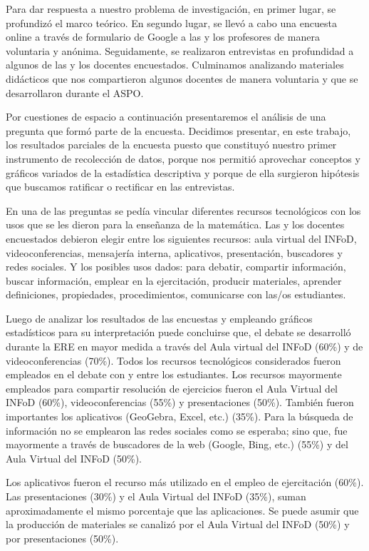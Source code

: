 Para dar respuesta a nuestro problema de investigación, en primer lugar, se profundizó el marco teórico. En segundo lugar, se llevó a cabo una encuesta online a través de formulario de Google a las y los profesores de manera voluntaria y anónima. Seguidamente, se realizaron entrevistas en profundidad a algunos de las y los docentes encuestados. Culminamos analizando materiales didácticos que nos compartieron algunos docentes de manera voluntaria y que se desarrollaron durante el ASPO.

Por cuestiones de espacio a continuación presentaremos el análisis de una pregunta que formó parte de la encuesta. Decidimos presentar, en este trabajo, los resultados parciales de la encuesta puesto que constituyó nuestro primer instrumento de recolección de datos, porque nos permitió aprovechar conceptos y gráficos variados de la estadística descriptiva y porque de ella surgieron hipótesis que buscamos ratificar o rectificar en las entrevistas.

En una de las preguntas se pedía vincular diferentes recursos tecnológicos con los usos que se les dieron para la enseñanza de la matemática. Las y los docentes encuestados debieron elegir entre los siguientes recursos: aula virtual del INFoD, videoconferencias, mensajería interna, aplicativos, presentación, buscadores y redes sociales. Y los posibles usos dados: para debatir, compartir información, buscar información, emplear en la ejercitación, producir materiales, aprender definiciones, propiedades, procedimientos, comunicarse con las/os estudiantes.

Luego de analizar los resultados de las encuestas y empleando gráficos estadísticos para su interpretación puede concluirse que, el debate se desarrolló durante la ERE en mayor medida a través del Aula virtual del INFoD (60\%) y de videoconferencias (70\%). Todos los recursos tecnológicos considerados fueron empleados en el debate con y entre los estudiantes. Los recursos mayormente empleados para compartir resolución de ejercicios fueron el Aula Virtual del INFoD (60\%), videoconferencias (55\%) y presentaciones (50\%). También fueron importantes los aplicativos (GeoGebra, Excel, etc.) (35\%). Para la búsqueda de información no se emplearon las redes sociales como se esperaba; sino que, fue mayormente a través de buscadores de la web (Google, Bing, etc.) (55\%) y del Aula Virtual del INFoD (50\%).

Los aplicativos fueron el recurso más utilizado en el empleo de ejercitación (60\%). Las presentaciones (30\%) y el Aula Virtual del INFoD (35\%), suman aproximadamente el mismo porcentaje que las aplicaciones. Se puede asumir que la producción de materiales se canalizó por el Aula Virtual del INFoD (50\%) y por presentaciones (50\%).


